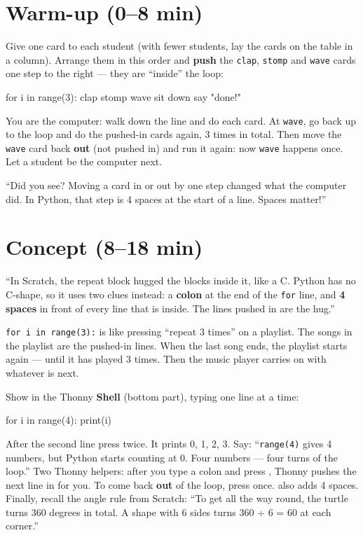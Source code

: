 \section{Warm-up (0--8 min)}
\begin{unplugged}
Give one card to each student (with fewer students, lay the cards on the table in a column). Arrange them in this order and \textbf{push} the \texttt{clap}, \texttt{stomp} and \texttt{wave} cards one step to the right --- they are \enquote{inside} the loop:
\begin{pycode}
for i in range(3):
    clap
    stomp
    wave
sit down
say "done!"
\end{pycode}
You are the computer: walk down the line and do each card. At \texttt{wave}, go back up to the loop and do the pushed-in cards again, 3 times in total. Then move the \texttt{wave} card back \textbf{out} (not pushed in) and run it again: now \texttt{wave} happens once. Let a student be the computer next.
\end{unplugged}
\begin{teacherscript}
\enquote{Did you see? Moving a card in or out by one step changed what the computer did. In Python, that step is 4 spaces at the start of a line. Spaces matter!}
\end{teacherscript}

\section{Concept (8--18 min)}
\begin{teacherscript}
\enquote{In Scratch, the repeat block hugged the blocks inside it, like a C. Python has no C-shape, so it uses two clues instead: a \textbf{colon} at the end of the \texttt{for} line, and \textbf{4 spaces} in front of every line that is inside. The lines pushed in are the hug.}
\end{teacherscript}
\begin{analogy}
\texttt{for i in range(3):} is like pressing \enquote{repeat 3 times} on a playlist. The songs in the playlist are the pushed-in lines. When the last song ends, the playlist starts again --- until it has played 3 times. Then the music player carries on with whatever is next.
\end{analogy}
Show in the Thonny \textbf{Shell} (bottom part), typing one line at a time:
\begin{pycode}
for i in range(4):
    print(i)
\end{pycode}
After the second line press  twice. It prints 0, 1, 2, 3. Say: \enquote{\texttt{range(4)} gives 4 numbers, but Python starts counting at 0. Four numbers --- four turns of the loop.}
Two Thonny helpers: after you type a colon and press , Thonny pushes the next line in for you. To come back \textbf{out} of the loop, press  once.  also adds 4 spaces.
Finally, recall the angle rule from Scratch: \enquote{To get all the way round, the turtle turns 360 degrees in total. A shape with 6 sides turns 360 ÷ 6 = 60 at each corner.}

